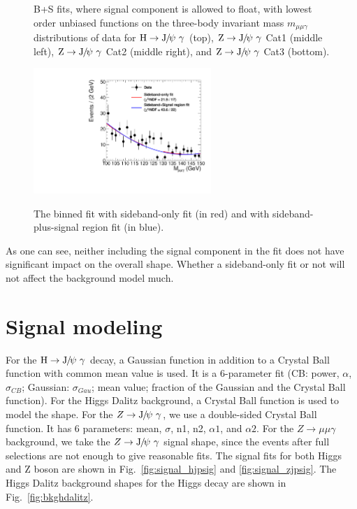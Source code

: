 \begin{figure}[p]
		    \caption[]{\label{fig:sbfitnotfix}
		     B+S fits, where signal component is allowed to float, with lowest order unbiased functions on the three-body invariant mass $m_{\mu\mu\gamma}$ distributions of data for $\PH\to \JPsi\ \gamma$ (top), $\cPZ\to \JPsi\ \gamma$ Cat1 (middle left), $\cPZ\to\JPsi\ \gamma$ Cat2 (middle right), and $\cPZ\to\JPsi\ \gamma$ Cat3 (bottom).}
		\end{figure}
		
		\begin{figure}[!ht]
		    \centering
		    \includegraphics[width=0.6\textwidth]{Fig/Fit/fitExclude}\\
		    \caption[]{\label{fig:binfit_compare}
		     The binned fit with sideband-only fit (in red) and with sideband-plus-signal region  fit (in blue).}
		\end{figure}
		
		As one can see, neither including the signal component in the fit does not have significant impact on the overall shape. Whether a sideband-only fit or not will not affect the background model much.
		
		\clearpage
		
		\section{Signal modeling}
		\label{sec:SigModel}
		For the $\PH\to\JPsi\ \gamma$ decay, a Gaussian function in addition to a Crystal Ball function with common mean value is used. It is a 6-parameter fit (CB: power, $\alpha$, $\sigma_{CB}$; Gaussian: $\sigma_{Gau}$; mean value; fraction of the Gaussian and the Crystal Ball function).
		For the Higgs Dalitz background, a Crystal Ball function is used to model the shape.
		For the $Z\to\JPsi\ \gamma$, we use a double-sided Crystal Ball function. It has 6 parameters: mean, $\sigma$, n1, n2, $\alpha 1$, and $\alpha 2$.
		For the $Z\to\mu\mu\gamma$ background, we take the $Z\to\JPsi\ \gamma$ signal shape, since the events after full selections are not enough to give reasonable fits.
		The signal fits for both Higgs and Z boson are shown in Fig.~\ref{fig:signal_hjpsig} and \ref{fig:signal_zjpsig}. The Higgs Dalitz background shapes for the Higgs decay are shown in Fig.~\ref{fig:bkghdalitz}.
		
